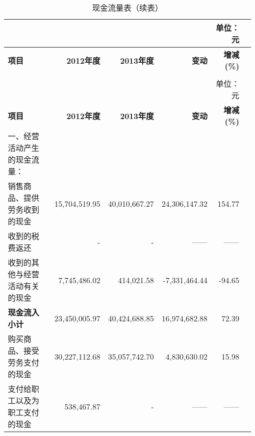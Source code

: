 \renewcommand*{\arraystretch}{0.8}
\setlength{\tabcolsep}{4pt}
\hspace*{-1cm}
\begin{longtable}{>{\scriptsize}l>{\scriptsize}r>{\scriptsize}r>{\scriptsize}r>{\scriptsize}r>{\scriptsize}r}
\caption[现金流量表]{现金流量表}\\  %
&&&& {\scriptsize 单位：元}\\
\hline\hline
\rowcolor{mycyan}	\hspace{3em} \bfseries 项目 	& \bfseries 2012年度\hspace{1em} & \bfseries 2013年度\hspace{1em} 	& \bfseries 变动\hspace{1em} &  \bfseries  增减(\%)    \\ \endfirsthead          %
\caption[]{现金流量表（续表）} \\ 
&&&& {\scriptsize 单位：元}\\                        %
\hline\hline
\rowcolor{mycyan}	\hspace{3em} \bfseries 项目 	& \bfseries 2012年度\hspace{1em} & \bfseries 2013年度\hspace{1em} 	& \bfseries 变动\hspace{1em} &  \bfseries  增减(\%)    \\ \endhead         %
\hline
\endfoot
\hline   %
	一、经营活动产生的现金流量：	&		&		&		&		\\
\hspace{2ex}	    销售商品、提供劳务收到的现金	&	15,704,519.95	&	40,010,667.27	&	24,306,147.32	&	154.77	\\
\hspace{2ex}	    收到的税费返还	&	  -           	&	  -           	&	——	&	——	\\
\hspace{2ex}	    收到的其他与经营活动有关的现金	&	7,745,486.02	&	414,021.58	&	-7,331,464.44	&	-94.65	\\
\hspace{3ex}\bfseries 	现金流入小计	&	23,450,005.97	&	40,424,688.85	&	16,974,682.88	&	72.39	\\
\hspace{2ex}	    购买商品、接受劳务支付的现金	&	30,227,112.68	&	35,057,742.70	&	4,830,630.02	&	15.98	\\
\hspace{2ex}	    支付给职工以及为职工支付的现金	&	538,467.87	&	  -           	&	——	&	——	\\

\end{longtable}

